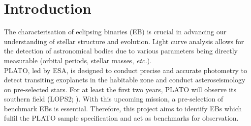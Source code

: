 \section{Introduction} \label{sec:Intro}
The characterisation of eclipsing binaries (EB) is crucial in advancing our understanding of stellar structure and evolution. Light curve analysis allows for the detection of astronomical bodies due to various parameters being directly measurable (orbital periods, stellar masses, \textit{etc.}). \\

PLATO, led by ESA, is designed to conduct precise and accurate photometry to detect transiting exoplanets in the habitable zone and conduct asteroseismology on pre-selected stars. For at least the first two years, PLATO will observe its southern field (LOPS2; \citealp{Rauer24}). With this upcoming mission, a pre-selection of benchmark EBs is essential. Therefore, this project aims to identify EBs which fulfil the PLATO sample specification and act as benchmarks for observation.\\






